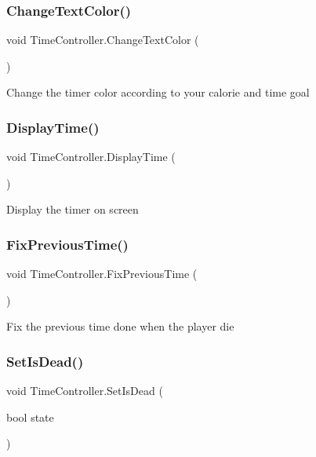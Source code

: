 \subsubsection{\texorpdfstring{Change\+Text\+Color()}{ChangeTextColor()}}
{\footnotesize\ttfamily void Time\+Controller.\+Change\+Text\+Color (\begin{DoxyParamCaption}{ }\end{DoxyParamCaption})\hspace{0.3cm}{\ttfamily [private]}}

Change the timer color according to your calorie and time goal \mbox{\label{class_time_controller_aaa0e1ce02dd37efd2811ff87906955ef}} 
\subsubsection{\texorpdfstring{Display\+Time()}{DisplayTime()}}
{\footnotesize\ttfamily void Time\+Controller.\+Display\+Time (\begin{DoxyParamCaption}{ }\end{DoxyParamCaption})\hspace{0.3cm}{\ttfamily [private]}}

Display the timer on screen \mbox{\label{class_time_controller_a6692282e48cb8eb9a4bf10d130d9c17a}} 
\subsubsection{\texorpdfstring{Fix\+Previous\+Time()}{FixPreviousTime()}}
{\footnotesize\ttfamily void Time\+Controller.\+Fix\+Previous\+Time (\begin{DoxyParamCaption}{ }\end{DoxyParamCaption})}

Fix the previous time done when the player die \mbox{\label{class_time_controller_a153403da1e9de2e547c7931ce044be7f}} 
\subsubsection{\texorpdfstring{Set\+Is\+Dead()}{SetIsDead()}}
{\footnotesize\ttfamily void Time\+Controller.\+Set\+Is\+Dead (\begin{DoxyParamCaption}\item[{bool}]{state }\end{DoxyParamCaption})}

